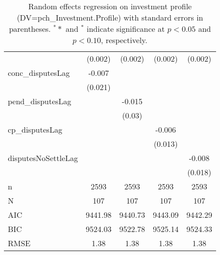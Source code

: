 \begin{table}[ht]
\begin{tabular}{lcccc}
   & (0.002) & (0.002) & (0.002) & (0.002) \\ 
  conc\_disputesLag & -0.007 &  &  &  \\ 
   & (0.021) &  &  &  \\ 
  pend\_disputesLag &  & -0.015 &  &  \\ 
   &  & (0.03) &  &  \\ 
  cp\_disputesLag &  &  & -0.006 &  \\ 
   &  &  & (0.013) &  \\ 
  disputesNoSettleLag &  &  &  & -0.008 \\ 
   &  &  &  & (0.018) \\ 
   \hline
n & 2593 & 2593 & 2593 & 2593 \\ 
  N & 107 & 107 & 107 & 107 \\ 
  AIC & 9441.98 & 9440.73 & 9443.09 & 9442.29 \\ 
  BIC & 9524.03 & 9522.78 & 9525.14 & 9524.33 \\ 
  RMSE & 1.38 & 1.38 & 1.38 & 1.38 \\ 
   \hline
\hline
\end{tabular}
\caption{Random effects regression on investment profile (DV=pch\_Investment.Profile) with standard errors in parentheses. $^**$ and $^*$ indicate significance at $p< 0.05 $ and $p< 0.10 $, respectively.} 
\end{table}
